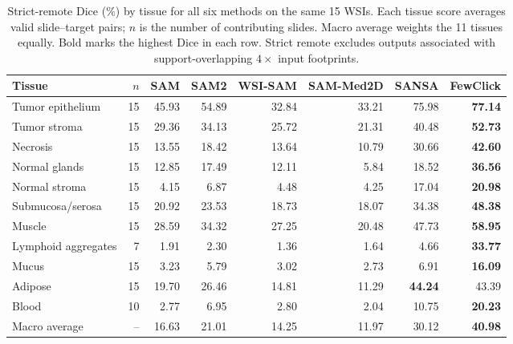 \begin{table}[t]
\centering
\caption{Strict-remote Dice (\%) by tissue for all six methods on the same 15 WSIs. Each tissue score averages valid slide--target pairs; $n$ is the number of contributing slides. Macro average weights the 11 tissues equally. Bold marks the highest Dice in each row. Strict remote excludes outputs associated with support-overlapping $4\times$ input footprints.}
\label{tab:perclass}
\small
\setlength{\tabcolsep}{4pt}
\begin{tabular}{@{}lrrrrrrr@{}}
\toprule
Tissue & $n$ & SAM & SAM2 & WSI-SAM & SAM-Med2D & SANSA & FewClick \\
\midrule
Tumor epithelium & 15 & 45.93 & 54.89 & 32.84 & 33.21 & 75.98 & \textbf{77.14} \\
Tumor stroma & 15 & 29.36 & 34.13 & 25.72 & 21.31 & 40.48 & \textbf{52.73} \\
Necrosis & 15 & 13.55 & 18.42 & 13.64 & 10.79 & 30.66 & \textbf{42.60} \\
Normal glands & 15 & 12.85 & 17.49 & 12.11 & 5.84 & 18.52 & \textbf{36.56} \\
Normal stroma & 15 & 4.15 & 6.87 & 4.48 & 4.25 & 17.04 & \textbf{20.98} \\
Submucosa/serosa & 15 & 20.92 & 23.53 & 18.73 & 18.07 & 34.38 & \textbf{48.38} \\
Muscle & 15 & 28.59 & 34.32 & 27.25 & 20.48 & 47.73 & \textbf{58.95} \\
Lymphoid aggregates & 7 & 1.91 & 2.30 & 1.36 & 1.64 & 4.66 & \textbf{33.77} \\
Mucus & 15 & 3.23 & 5.79 & 3.02 & 2.73 & 6.91 & \textbf{16.09} \\
Adipose & 15 & 19.70 & 26.46 & 14.81 & 11.29 & \textbf{44.24} & 43.39 \\
Blood & 10 & 2.77 & 6.95 & 2.80 & 2.04 & 10.75 & \textbf{20.23} \\
\midrule Macro average & -- & 16.63 & 21.01 & 14.25 & 11.97 & 30.12 & \textbf{40.98} \\
\bottomrule
\end{tabular}
\end{table}
